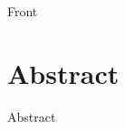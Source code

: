 \documentclass[12pt,onesidet]{report}
\begin{document}
	
	    
	\begin{titlepage}
		{Front}
	\end{titlepage}
    
    \chapter*{Abstract}
    {Abstract}
    
\end{document}
